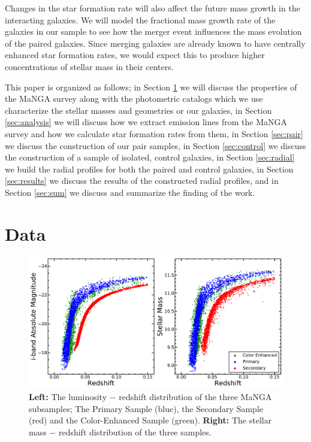 \documentclass[iop,revtex4,twocolumn,apj,numberedappendix,appendixfloats]{emulateapj}
\begin{document}
Changes in the star formation rate will also affect the future mass growth in the interacting galaxies. We will model the fractional mass growth rate of the galaxies in our sample to see how the merger event influences the mass evolution of the paired galaxies. Since merging galaxies are already known to have centrally enhanced star formation rates, we would expect this to produce higher concentrations of stellar mass in their centers.

This paper is organized as follows; in Section \ref{sec:data} we will discuss the properties of the MaNGA survey along with the photometric catalogs which we use characterize the stellar masses and geometries or our galaxies, in Section \ref{sec:analysis} we will discuss how we extract emission lines from the MaNGA survey and how we calculate star formation rates from them, in Section \ref{sec:pair} we discuss the construction of our pair samples, in Section \ref{sec:control} we discuss the construction of a sample of isolated, control galaxies, in Section \ref{sec:radial} we build the radial profiles for both the paired and control galaxies, in Section \ref{sec:results} we discuss the results of the constructed radial profiles, and in Section \ref{sec:sum} we discuss and summarize the finding of the work. 

\section{Data}\label{sec:data}

\begin{figure}
\centering
\includegraphics[width=\linewidth]{fig/Mi-z.pdf}
\caption[]{\textbf{Left:} The luminosity $-$ redshift distribution of the three MaNGA subsamples; The Primary Sample (blue), the Secondary Sample (red) and the Color-Enhanced Sample (green). \textbf{Right:} The stellar mass $-$ redshift distribution of the three samples. }
\label{fig:Mi-z}
\end{figure}
\end{document}
